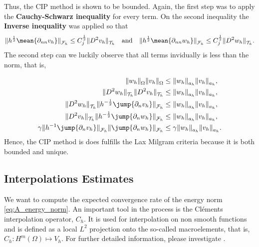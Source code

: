 Thus, the CIP method is shown to be bounded.
Again, the first step was to apply the \textbf{Cauchy-Schwarz inequality} for every term. On the second inequality the \textbf{Inverse inequality} was applied so that
\[
\| h^{\frac{1}{2}} \mean{ \partial _{nn}v_{h} }   \|_{ \mathcal{F} _{h}  }^{  }\le   C_{j}^{\frac{1}{2}} \| D ^2 v_{h} \|_{ \mathcal{T} _{h} }^{  } \quad \text{and} \quad   \| h^{\frac{1}{2}} \mean{ \partial _{nn}w_{h} }   \|_{ \mathcal{F} _{h}
}^{  }\le   C_{j}^{\frac{1}{2}} \| D ^2 w_{h} \|_{ \mathcal{T} _{h} }^{  }.
\]
The second step can we luckily observe that all terms invidually is less than the norm, that is,

\begin{equation}
\label{eq:bounded_ineq}
\begin{split}
\| w_{h} \|_{\Omega    }^{  }  \| v_{h} \|_{ \Omega    }^{  } & \le \| w_{h} \|_{ a_{h} }^{  } \| v_{h} \|_{ a_{h} }^{  }, \\
\| D ^2w_{h} \|_{\mathcal{T}_{h}   }^{  }  \| D ^2v_{h} \|_{\mathcal{T}_{h}   }^{  } & \le \| w_{h} \|_{ a_{h} }^{  } \| v_{h} \|_{ a_{h} }^{  }, \\
\|  D ^2 w_{h} \|_{ \mathcal{T} _{h} }^{ } \| h^{-\frac{1}{2}} \jump{ \partial _{n} v_{h} }   \|_{ \mathcal{F} _{h} }^{  }  & \le  \| w_{h} \|_{ a_{h} }^{  } \| v_{h} \|_{ a_{h} }^{  }, \\
   \|  D ^2 v_{h} \|_{ \mathcal{T} _{h} }^{ } \| h^{-\frac{1}{2}} \jump{ \partial _{n} w_{h} }   \|_{ \mathcal{F} _{h} }^{  }   & \le \| w_{h} \|_{ a_{h} }^{  } \| v_{h} \|_{ a_{h} }^{  }, \\
 \gamma \| h^{-1 } \jump{ \partial _{n} v_{h} }    \|_{ \mathcal{F} _{h}  }^{  }  \| \jump{ \partial _{n} w_{h} }    \|_{\mathcal{F}_{h}   }^{  }   & \le \gamma \| w_{h} \|_{ a_{h} }^{  }  \| v_{h} \|_{ a_{h} }^{  }.
\end{split}
\end{equation}
Hence, the CIP method is does fulfills the Lax Milgram criteria because it is both bounded and unique.

\subsection{Interpolations Estimates}%
\label{sub:clements_lemma}


We want to compute the expected convergence rate of the energy norm \eqref{eq:A_energy_norm}. An important tool in the process is the Cléments interpolation operator, $C_{h}$.
It is used for interpolation on non smooth functions and is defined as a local $L^{2}$ projection onto the so-called macroelements, that is, $C_{h}: H^{m} \left( \Omega  \right) \mapsto V_{h}$. For further detailed information, please investigate \cite{ern04}.


